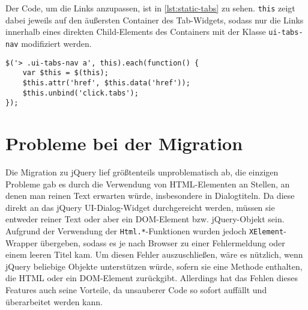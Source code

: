 Der Code, um die Links anzupassen, ist in \autoref{lst:static-tabs} zu sehen. \lstinline{this} zeigt
dabei jeweils auf den äußersten Container des Tab-Widgets, sodass nur die Links innerhalb eines
direkten Child-Elements des Containers mit der Klasse \lstinline{ui-tabs-nav} modifiziert werden.

\begin{lstlisting}[label=lst:static-tabs,caption=Umwandlung der Tabs in reguläre Links]
$('> .ui-tabs-nav a', this).each(function() {
    var $this = $(this);
    $this.attr('href', $this.data('href'));
    $this.unbind('click.tabs');
});
\end{lstlisting}


\section{Probleme bei der Migration}

Die Migration zu jQuery lief größtenteils unproblematisch ab, die einzigen Probleme gab es durch die
Verwendung von HTML-Elementen an Stellen, an denen man reinen Text erwarten würde, insbesondere in
Dialogtiteln. Da diese direkt an das jQuery UI-Dialog-Widget durchgereicht werden, müssen sie
entweder reiner Text oder aber ein DOM-Element bzw. jQuery-Objekt sein. Aufgrund der Verwendung der
\lstinline{Html.*}-Funktionen wurden jedoch \lstinline{XElement}-Wrapper übergeben, sodass es je
nach Browser zu einer Fehlermeldung oder einem leeren Titel kam. Um diesen Fehler auszuschließen,
wäre es nützlich, wenn jQuery beliebige Objekte unterstützen würde, sofern sie eine Methode
enthalten, die HTML oder ein DOM-Element zurückgibt. Allerdings hat das Fehlen dieses Features auch
seine Vorteile, da unsauberer Code so sofort auffällt und überarbeitet werden kann.

